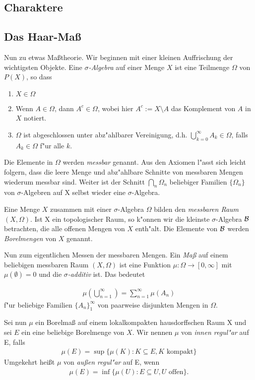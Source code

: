 \subsection{Charaktere}
\subsection{Das Haar-Maß}
	Nun zu etwas Maßtheorie. Wir beginnen mit einer kleinen Auffrischung der wichtigsten Objekte. Eine \emph{$\sigma$-Algebra} auf einer Menge $X$ ist eine Teilmenge $\Omega$ von $P(X)$, so dass
	\begin{enumerate}[label=(\roman*)]
		\item $X \in \Omega$
		\item Wenn $A \in \Omega$, dann $A^c \in \Omega$, wobei hier $A^c := X\setminus A$ das Komplement von $A$ in $X$ notiert.
		\item $\Omega$ ist abgeschlossen unter abz"ahlbarer Vereinigung, d.h. $\bigcup_{k=0}^{\infty} A_k \in \Omega$, falls $A_k \in \Omega$ f"ur alle $k$.
	\end{enumerate}
	Die Elemente in $\Omega$ werden \emph{messbar} genannt. Aus den Axiomen l"asst sich leicht folgern, dass die leere Menge und abz"ahlbare Schnitte von messbaren Mengen wiederum messbar sind. Weiter ist der Schnitt $\bigcap_n \Omega_n$ beliebiger Familien $\{\Omega_n\}$ von $\sigma$-Algebren auf X selbst wieder eine $\sigma$-Algebra.
	
	
	Eine Menge $X$ zusammen mit einer $\sigma$-Algebra $\Omega$ bilden den \emph{messbaren Raum} $(X, \Omega)$. Ist X ein topologischer Raum, so k"onnen wir die kleinste $\sigma$-Algebra $\mathcal{B}$ betrachten, die alle offenen Mengen von $X$ enth"alt. Die Elemente von $\mathcal{B}$ werden \emph{Borelmengen} von $X$ genannt.
	
	
	Nun zum eigentlichen Messen der messbaren Mengen. Ein \emph{Maß} auf einem beliebigen messbaren Raum $(X, \Omega)$ ist eine Funktion $\mu: \Omega \to [0, \infty]$ mit $\mu(\emptyset) = 0$ und die \emph{$\sigma$-additiv} ist. Das bedeutet
	
	\begin{align*}
		\mu( \bigcup_{n=1}^{\infty}) = \sum_{n=1}^{\infty} \mu (A_n)
	\end{align*}
	f"ur beliebige Familien $\{A_n\}_1^\infty$ von paarweise disjunkten Mengen in $\Omega$.
	
	
	Sei nun $\mu$ ein Borelmaß auf einem lokalkompakten hausdorffschen Raum X und sei $E$ ein eine beliebige Borelmenge von $X$.
	Wir nennen $\mu$ von \emph{innen regul"ar} auf E, falls
	\begin{align*}
		\mu(E) = \sup\{\mu(K): K \subseteq E, K \text{ kompakt}\}
	\end{align*}
	Umgekehrt heißt $\mu$ von \emph{außen regul"ar} auf E, wenn
	\begin{align*}
		\mu(E) = \inf\{\mu(U): E \subseteq U, U \text{ offen}\}.
	\end{align*}
	
